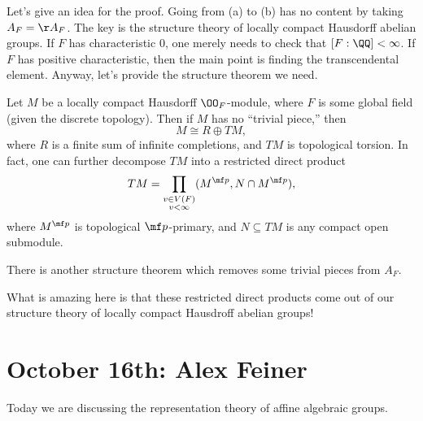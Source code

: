 \documentclass{article}
\begin{document}
Let's give an idea for the proof. Going from (a) to (b) has no content by taking $A_F=\AA_F$. The key is the structure theory of locally compact Hausdorff abelian groups. If $F$ has characteristic $0$, one merely needs to check that $[F:\QQ]<\infty$. If $F$ has positive characteristic, then the main point is finding the transcendental element. Anyway, let's provide the structure theorem we need.
\begin{theorem}[Levin]
	Let $M$ be a locally compact Hausdorff $\OO_F$-module, where $F$ is some global field (given the discrete topology). Then if $M$ has no ``trivial piece,'' then
	\[M\cong R\oplus TM,\]
	where $R$ is a finite sum of infinite completions, and $TM$ is topological torsion. In fact, one can further decompose $TM$ into a restricted direct product
	\[TM=\prod_{\substack{v\in V(F)\\v<\infty}}(M^{\mf p},N\cap M^{\mf p}),\]
	where $M^{\mf p}$ is topological $\mf p$-primary, and $N\subseteq TM$ is any compact open submodule.
\end{theorem}
\begin{remark}
	There is another structure theorem which removes some trivial pieces from $A_F$.
\end{remark}
What is amazing here is that these restricted direct products come out of our structure theory of locally compact Hausdroff abelian groups!

\section{October 16th: Alex Feiner}
Today we are discussing the representation theory of affine algebraic groups.
\end{document}
